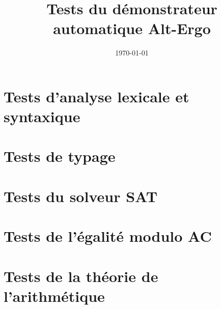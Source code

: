 \documentclass[a4paper,12pt]{article}
\title{\Large Tests du démonstrateur automatique Alt-Ergo}
\date\today
\begin{document}
\maketitle

\tableofcontents

\bigskip\bigskip

\newpage

\section{Tests d'analyse lexicale et syntaxique}







\section{Tests de typage}








\section{Tests du solveur SAT}








\section{Tests de l'égalité modulo AC}








\section{Tests de la théorie de l'arithmétique}






\end{document}
